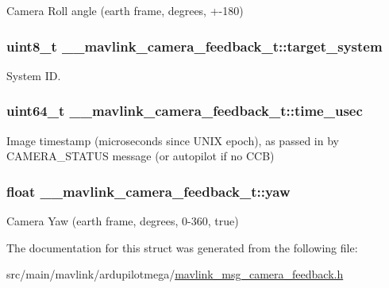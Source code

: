 Camera Roll angle (earth frame, degrees, +-\/180) 

\hypertarget{struct____mavlink__camera__feedback__t_a0906a3aa87c2534c80bc6f9be921c7d3}{
\subsubsection[{target\+\_\+system}]{\setlength{\rightskip}{0pt plus 5cm}uint8\+\_\+t \+\_\+\+\_\+mavlink\+\_\+camera\+\_\+feedback\+\_\+t\+::target\+\_\+system}}\label{struct____mavlink__camera__feedback__t_a0906a3aa87c2534c80bc6f9be921c7d3}


System I\+D. 

\hypertarget{struct____mavlink__camera__feedback__t_aa477d85a398613f94889545beb0b52ce}{
\subsubsection[{time\+\_\+usec}]{\setlength{\rightskip}{0pt plus 5cm}uint64\+\_\+t \+\_\+\+\_\+mavlink\+\_\+camera\+\_\+feedback\+\_\+t\+::time\+\_\+usec}}\label{struct____mavlink__camera__feedback__t_aa477d85a398613f94889545beb0b52ce}


Image timestamp (microseconds since U\+N\+I\+X epoch), as passed in by C\+A\+M\+E\+R\+A\+\_\+\+S\+T\+A\+T\+U\+S message (or autopilot if no C\+C\+B) 

\hypertarget{struct____mavlink__camera__feedback__t_a49cedce2e036818b2bf6189f02bf652f}{
\subsubsection[{yaw}]{\setlength{\rightskip}{0pt plus 5cm}float \+\_\+\+\_\+mavlink\+\_\+camera\+\_\+feedback\+\_\+t\+::yaw}}\label{struct____mavlink__camera__feedback__t_a49cedce2e036818b2bf6189f02bf652f}


Camera Yaw (earth frame, degrees, 0-\/360, true) 



The documentation for this struct was generated from the following file\+:\begin{DoxyCompactItemize}
\item 
src/main/mavlink/ardupilotmega/\hyperlink{mavlink__msg__camera__feedback_8h}{mavlink\+\_\+msg\+\_\+camera\+\_\+feedback.\+h}\end{DoxyCompactItemize}
